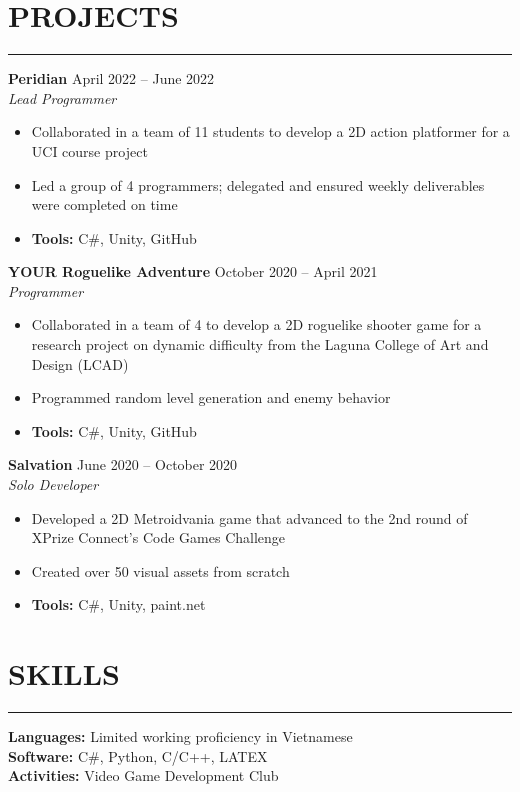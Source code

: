 \documentclass{article}
\begin{document}
\section*{PROJECTS} \vspace{-6pt} \hrule \vspace{6pt}
\textbf{Peridian} \hfill April 2022 -- June 2022\\
\emph{Lead Programmer}
\begin{itemize}
	\item\vspace{-6pt} Collaborated in a team of 11 students to develop a 2D action platformer for a UCI course project
	\item\vspace{-6pt} Led a group of 4 programmers; delegated and ensured weekly deliverables were completed on time
	\item\vspace{-6pt} \textbf{Tools:} C\#, Unity, GitHub
\end{itemize}
\vspace{-6pt}
\textbf{YOUR Roguelike Adventure} \hfill October 2020 -- April 2021\\
\emph{Programmer}
\begin{itemize}
	\item\vspace{-6pt} Collaborated in a team of 4 to develop a 2D roguelike shooter game for a research project on dynamic difficulty from the Laguna College of Art and Design (LCAD)
	\item\vspace{-6pt} Programmed random level generation and enemy behavior
	\item\vspace{-6pt} \textbf{Tools:} C\#, Unity, GitHub
\end{itemize}
\vspace{-6pt}
\textbf{Salvation} \hfill June 2020 -- October 2020\\
\emph{Solo Developer}
\begin{itemize}
	\item\vspace{-6pt} Developed a 2D Metroidvania game that advanced to the 2nd round of XPrize Connect's Code Games Challenge
	\item\vspace{-6pt} Created over 50 visual assets from scratch
	\item\vspace{-6pt} \textbf{Tools:} C\#, Unity, paint.net
\end{itemize}
\vspace{-10pt}

\section*{SKILLS} \vspace{-6pt} \hrule \vspace{6pt}
\textbf{Languages:} Limited working proficiency in Vietnamese\\
\textbf{Software:} C$\#$, Python, C/C++, LATEX  \\
\textbf{Activities:} Video Game Development Club
\end{document}
